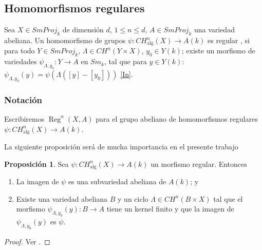 \documentclass[10pt]{amsart}
\theoremstyle{definition}
\newtheorem{proposition}[definition]{Proposici\'on}
\theoremstyle{remark}
\theoremstyle{definition}
\begin{document}
\subsection{Homomorfismos regulares}\label{HR}

Sea $X \in SmProj_{k}$ de dimensión $d$, $1 \leq n \leq d$, $A \in SmProj_{k}$ una variedad abeliana. Un homomorfismo de grupos $\psi: CH^{n}_{\mathrm{alg}}(X) \to A(k)$ es regular \cite[p. 477]{Sam60}, si para todo $Y \in SmProj_{k}$, $\Lambda \in CH^{n}(Y \times X)$, $y_{0} \in Y(k)$; existe un morfismo de variedades $\psi_{\Lambda,y_{0}}: Y \to A$ en $Sm_{k}$, tal que para $y \in Y(k)$: $\psi_{\Lambda,y_{0}}(y) = \psi(\Lambda([y] - [y_{0}]))$ \ref{In}.

\subsubsection{Notación}\label{HR0}

Escribiremos $\operatorname{Reg}^{n}(X, A)$ para el grupo abeliano de homomorfismos regulares $\psi: CH^{n}_{\mathrm{alg}}(X) \to A(k)$.

La siguiente proposici\'on ser\'a de mucha importancia en el presente trabajo
\begin{proposition}\label{HS1}
Sea $\psi:CH^{n}_{\mathrm{alg}}(X) \rightarrow A(\mathit{k})$ un morfismo regular. Entonces
\begin{enumerate}
\item La imagen de $\psi$ es una subvariedad abeliana de $A(\mathit{k})$; y
\item Existe una variedad abeliana $B$ y un ciclo $\Lambda \in CH^{n}(B \times X)$ tal que el morfismo  $\psi_{\Lambda,y_{0}}(y) : B \rightarrow A$ tiene un kernel finito y que la imagen de $\psi_{\Lambda,y_{0}}(y)$ es $\psi$.
\end{enumerate}
\end{proposition}

\begin{proof}
Ver \cite[Prop. 1.2]{Sai79}.
\end{proof}
\end{document}
